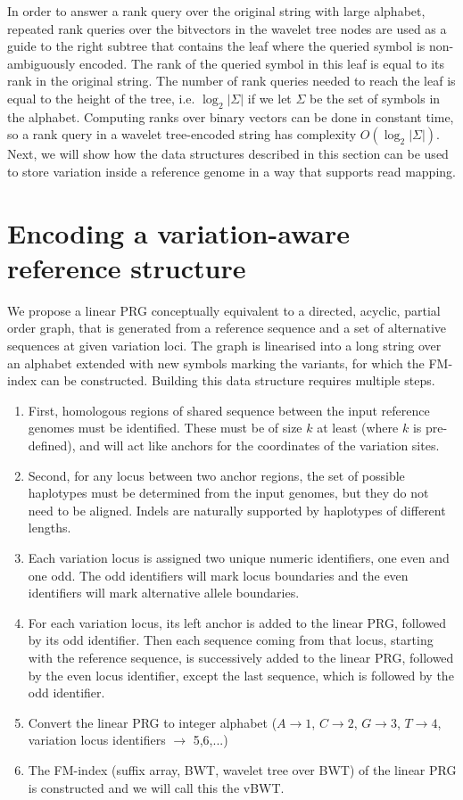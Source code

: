 \documentclass[runningheads,a4paper]{llncs}
\begin{document}
In order to answer a rank query over the original string with large alphabet, repeated rank queries over the bitvectors in the wavelet tree nodes are used as a guide to the right subtree that contains the leaf where the queried symbol is non-ambiguously encoded. The rank of the queried symbol in this leaf is equal to its rank in the original string. The number of rank queries needed to reach the leaf is equal to the height of the tree, i.e. $\log_{2} {|\Sigma|}$ if we let $\Sigma$ be the set of symbols in the alphabet. Computing ranks over binary vectors can be done in constant time, so a rank query in a wavelet tree-encoded string has complexity $O(\log_{2} {|\Sigma|})$. Next, we will show how the data structures described in this section can be used to store variation inside a reference genome in a way that supports read mapping.

\section{Encoding a variation-aware reference structure}

We propose a linear PRG conceptually equivalent to a directed, acyclic, partial order graph, that is generated from a reference sequence and a set of alternative sequences at given variation loci. The graph is linearised into a long string over an alphabet extended with new symbols marking the variants, for which the FM-index can be constructed. Building this data structure requires multiple steps. 
\begin{enumerate}
\item First, homologous regions of shared sequence between the input reference genomes must be identified. These must be of size $k$ at least (where $k$ is pre-defined), and will act like anchors for the coordinates of the variation sites. 
\item Second, for any locus between two anchor regions, the set of possible haplotypes must be determined from the input genomes, but they do not need to be aligned. Indels are naturally supported by haplotypes of different lengths.
\item Each variation locus is assigned two unique numeric identifiers, one even and one odd. The odd identifiers will mark locus boundaries and the even identifiers will mark alternative allele boundaries.
\item For each variation locus, its left anchor is added to the linear PRG, followed by its odd identifier. Then each sequence coming from that locus, starting with the reference sequence, is successively added to the linear PRG, followed by the even locus identifier, except the last sequence, which is followed by the odd identifier.
\item Convert the linear PRG to integer alphabet ($A\rightarrow 1$, $C\rightarrow2$, $G\rightarrow3$, $T\rightarrow4$, variation locus identifiers $\rightarrow$ 5,6,...)
\item The FM-index (suffix array, BWT, wavelet tree over BWT) of the linear PRG is constructed and we will call this the vBWT.
\end{enumerate}
\end{document}
